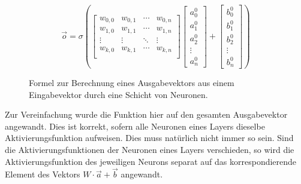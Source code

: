 \documentclass[11pt]{article}
\begin{document}
\begin{figure}[h]
	\begin{equation*}
		\vec{o} = \sigma\left(
		\begin{bmatrix}
			w_{0,0} & w_{0,1} & \cdots & w_{0,n}\\
			w_{1,0} & w_{1,1} & \cdots & w_{1,n}\\
			\vdots & \vdots & \ddots & \vdots\\
			w_{k,0} & w_{k,1} & \cdots & w_{k,n}\\
		\end{bmatrix}
		\begin{bmatrix}
			a^0_0\\
			a^0_1\\
			a^0_2\\
			\vdots\\
			a^0_n
		\end{bmatrix}
		+
		\begin{bmatrix}
			b^0_0\\
			b^0_1\\
			b^0_2\\
			\vdots\\
			b^0_n
		\end{bmatrix}
		\right)
	\end{equation*}
	\caption{Formel zur Berechnung eines Ausgabevektors aus einem Eingabevektor durch eine Schicht von Neuronen. }
\end{figure}
\newline
Zur Vereinfachung wurde die Funktion hier auf den gesamten Ausgabevektor angewandt. Dies ist korrekt, sofern alle Neuronen eines Layers dieselbe Aktivierungsfunktion aufweisen. Dies muss natürlich nicht immer so sein. Sind die Aktivierungsfunktionen der Neuronen eines Layers verschieden, so wird die Aktivierungsfunktion des jeweiligen Neurons separat auf das korrespondierende Element des Vektors $W\cdot\vec{a}+\vec{b}$ angewandt.
\end{document}
